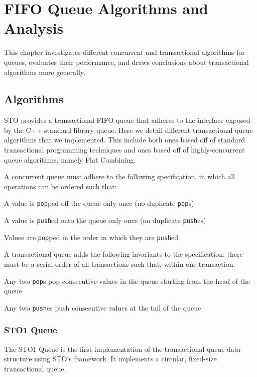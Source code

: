 \section{FIFO Queue Algorithms and Analysis}

This chapter investigates different concurrent and transactional algorithms for queues, evaluates their performance, and draws conclusions about transactional algorithms more generally.


\subsection{Algorithms}

STO provides a transactional FIFO queue that adheres to the interface exposed by the C++ standard library queue. Here we detail different transactional queue algorithms that we implemented. This include both ones based off of standard transactional programming techniques and ones based off of highly-concurrent queue algorithms, namely Flat Combining.

A concurrent queue must adhere to the following specification, in which all operations can be ordered such that:
\begin{bullets}
    \item A value is \texttt{pop}ped off the queue only once (no duplicate \texttt{pop}s)
    \item A value is \texttt{push}ed onto the queue only once (no duplicate \texttt{push}es)
    \item Values are \texttt{pop}ped in the order in which they are \texttt{push}ed
\end{bullets}

A transactional queue adds the following invariants to the specification; there must be a serial order of all transactions such that, within one transaction:
\begin{bullets}
    \item Any two \texttt{pop}s pop consecutive values in the queue starting from the head of the queue 
    \item Any two \texttt{push}es push consecutive values at the tail of the queue
\end{bullets}

\subsubsection{STO1 Queue}
The STO1 Queue is the first implementation of the transactional queue data structure using STO’s framework. It implements a circular, fixed-size transactional queue.

